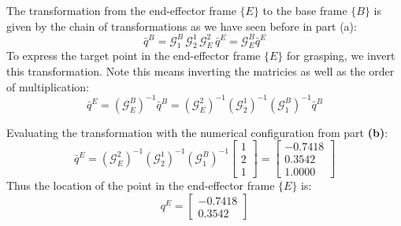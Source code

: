 \begin{enumerate}[label=\textbf{(\alph*)}]
    The transformation from the end-effector frame $\{E\}$ to the base frame $\{B\}$ is given by the chain of transformations as we have seen before in part (a):
    \begin{equation}
        \bar{q}^B = \mathcal{G}_1^B \, \mathcal{G}_2^1 \, \mathcal{G}_E^2 \, \bar{q}^E = \mathcal{G}_E^B \bar{q}^E
    \end{equation}
    To express the target point in the end-effector frame $\{E\}$ for grasping, we invert this transformation. Note this means inverting the matricies as well as the order of multiplication:
    \begin{equation}
        \bar{q}^E = (\mathcal{G}_E^B)^{-1} \bar{q}^B = (\mathcal{G}_E^2)^{-1} (\mathcal{G}_2^1)^{-1} (\mathcal{G}_1^B)^{-1} \bar{q}^B
    \end{equation}

    Evaluating the transformation with the numerical configuration from part \textbf{(b)}:
    \begin{equation}
        \bar{q}^E = (\mathcal{G}_E^2)^{-1} (\mathcal{G}_2^1)^{-1} (\mathcal{G}_1^B)^{-1} \begin{bmatrix} 1 \\ 2 \\ 1 \end{bmatrix} = \begin{bmatrix} -0.7418 \\ 0.3542 \\ 1.0000 \end{bmatrix}
    \end{equation}
    Thus the location of the point in the end-effector frame $\{E\}$ is:
    \begin{equation}
        q^E = \begin{bmatrix} -0.7418 \\ 0.3542 \end{bmatrix}
    \end{equation}
\end{enumerate}
